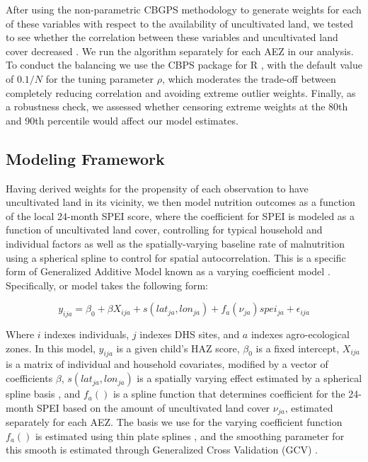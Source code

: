 \documentclass{article}
\begin{document}
After using the non-parametric CBGPS methodology to generate weights for each of these variables with respect to the availability of uncultivated land, we tested to see whether the correlation between these variables and uncultivated land cover decreased \cite{Fong2018}.  We run the algorithm separately for each AEZ in our analysis.  To conduct the balancing we use the CBPS package for R \cite{Fong2018a}, with the default value of $0.1/N$ for the tuning parameter $\rho$, which moderates the trade-off between completely reducing correlation and avoiding extreme outlier weights.  Finally, as a robustness check, we assessed whether censoring extreme weights at the 80th and 90th percentile would affect our model estimates.

\subsection{Modeling Framework}
Having derived weights for the propensity of each observation to have uncultivated land in its vicinity, we then model nutrition outcomes as a function of the local 24-month SPEI score, where the coefficient for SPEI is modeled as a function of uncultivated land cover, controlling for typical household and individual factors as well as the spatially-varying baseline rate of malnutrition using a spherical spline to control for spatial autocorrelation.  This is a specific form of Generalized Additive Model \cite{Hastie1986} known as a varying coefficient model \cite{Wood2017}.  Specifically, or model takes the following form:

\begin{equation}
  y_{ija} = \beta_0 + \beta X_{ija} + s(lat_{ja}, lon_{ja}) + f_{a}(\nu_{ja}) spei_{ja} + \epsilon_{ija} \label{eqn:GAM}
\end{equation}

Where $i$ indexes individuals, $j$ indexes DHS sites, and $a$ indexes agro-ecological zones. In this model, $y_{ija}$ is a given child's HAZ score, $\beta_0$ is a fixed intercept, $X_{ija}$ is a matrix of individual and household covariates, modified by a vector of coefficients $\beta$, $s(lat_{ja}, lon_{ja})$ is a spatially varying effect estimated by a spherical spline basis \cite{Wahba1982}, and $f_{a}()$ is a spline function that determines coefficient for the 24-month SPEI based on the amount of uncultivated land cover $\nu_{ja}$, estimated separately for each AEZ.  The basis we use for the varying coefficient function $f_{a}()$ is estimated using thin plate splines \cite{Duchon1977}, and the smoothing parameter for this smooth is estimated through Generalized Cross Validation (GCV) \cite{Wood2017}.
\end{document}
